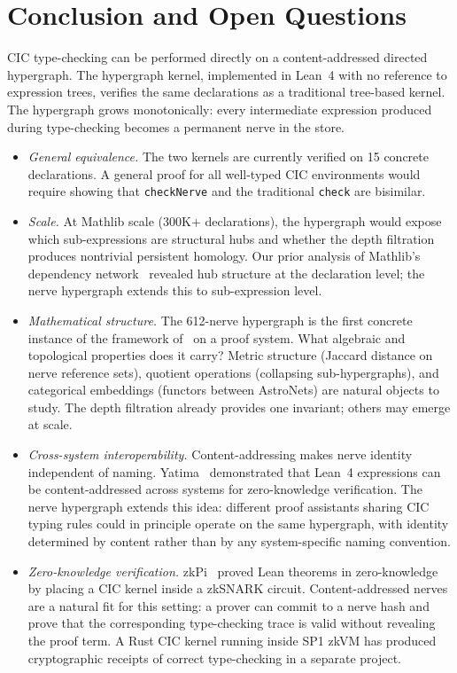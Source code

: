 \section{Conclusion and Open Questions}\label{sec:conclusion}

CIC type-checking can be performed directly on a content-addressed directed hypergraph.  The hypergraph kernel, implemented in Lean~4 with no reference to expression trees, verifies the same declarations as a traditional tree-based kernel.  The hypergraph grows monotonically: every intermediate expression produced during type-checking becomes a permanent nerve in the store.

\begin{itemize}
\item \emph{General equivalence.}  The two kernels are currently verified on 15 concrete declarations.  A general proof for all well-typed CIC environments would require showing that \texttt{checkNerve} and the traditional \texttt{check} are bisimilar.
\item \emph{Scale.}  At Mathlib scale (300K+ declarations), the hypergraph would expose which sub-expressions are structural hubs and whether the depth filtration produces nontrivial persistent homology.  Our prior analysis of Mathlib's dependency network~\cite{LPSS26b} revealed hub structure at the declaration level; the nerve hypergraph extends this to sub-expression level.
\item \emph{Mathematical structure.}  The 612-nerve hypergraph is the first concrete instance of the framework of~\cite{BDF2026} on a proof system.  What algebraic and topological properties does it carry?  Metric structure (Jaccard distance on nerve reference sets), quotient operations (collapsing sub-hypergraphs), and categorical embeddings (functors between AstroNets) are natural objects to study.  The depth filtration already provides one invariant; others may emerge at scale.
\item \emph{Cross-system interoperability.}  Content-addressing makes nerve identity independent of naming.  Yatima~\cite{Arg23} demonstrated that Lean~4 expressions can be content-addressed across systems for zero-knowledge verification.  The nerve hypergraph extends this idea: different proof assistants sharing CIC typing rules could in principle operate on the same hypergraph, with identity determined by content rather than by any system-specific naming convention.
\item \emph{Zero-knowledge verification.}  zkPi~\cite{zkPi} proved Lean theorems in zero-knowledge by placing a CIC kernel inside a zkSNARK circuit.  Content-addressed nerves are a natural fit for this setting: a prover can commit to a nerve hash and prove that the corresponding type-checking trace is valid without revealing the proof term.  A Rust CIC kernel running inside SP1 zkVM has produced cryptographic receipts of correct type-checking in a separate project.
\end{itemize}
